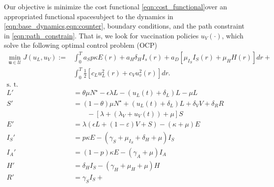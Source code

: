     Our objective is minimize the cost functional
\eqref{eqn:cost_functional}\textemdash over an appropriated functional
space\textemdash subject to the dynamics in
\cref{eqn:base_dynamics,eqn:counter}, boundary conditions, and the path
constraint in \eqref{eqn:path_constrain}.
That is, we look for vaccination policies $u_V(\cdot)$, which
solve the following optimal control problem (OCP)
\begin{equation}
    \label{eqn:lockdown_vaccination_ocp}
    \begin{aligned}
        \min_{\mathbf{u} \in \mathcal{U}}
            J(u_L, u_V) := &
                \int_0 ^  T
                    a_S p \kappa E(r) +
                    a_H \delta_H I_s(r) +
                    a_D
                    \left[
                        \mu_{I_S} I_S(r) + \mu_H H(r)
                    \right]
                dr +
        \\
                &
                \int_0^T
                    \frac{1}{2}
                    \left[
                        c_L u_L^2(r) +
                        c_V u_v^2(r)
                    \right]
                    dr.
        \\
            \text{s. t.} &
        \\
            L' & =  \theta \mu N^{\star}
                -\epsilon \lambda L - (u_L(t) + \delta_L) L - \mu L
        \\
            S' & =
                (1 - \theta) \mu N^\star
                + (u_L(t) + \delta_L) L
                + \delta_V V
                + \delta_R R
        \\
                & \qquad -
                \left[
                \lambda + (\lambda_V + u_V(t)) + \mu
                \right] S
        \\
            E' &=
                \lambda (\epsilon L + (1-\varepsilon) V + S)
                - (\kappa + \mu) E
        \\
            I_S' &=
                p \kappa E
                - (\gamma_S +
                    \mu_{I_S} +
                    \delta_H +
                    \mu) I_S
        \\
            I_A' &=
                (1 - p) \kappa E - (\gamma_A + \mu) I_A
        \\
            H' &=
                \delta_H I_S - (\gamma_H + \mu_H + \mu) H
        \\
            R'  &=
                \gamma_S I_S +

\end{aligned}
\end{equation}
